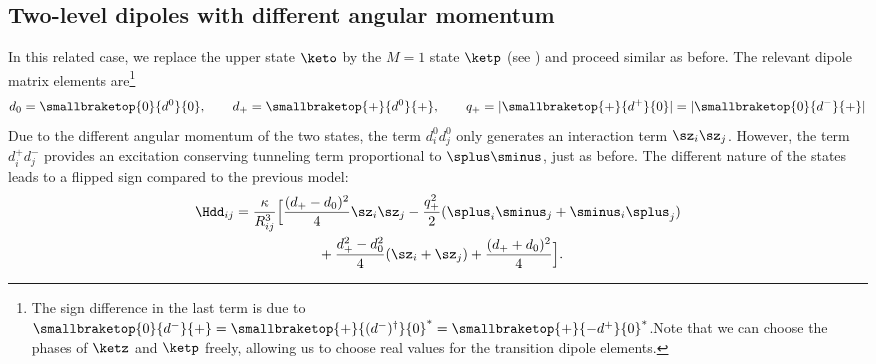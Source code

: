 
\subsection{Two-level dipoles with different angular momentum}
In this related case, we replace the upper state $\keto$ by the $M=1$ state $\ketp$ (see ) and proceed similar as before.
The relevant dipole matrix elements are\footnote{The sign difference in the last term is due to $\smallbraketop{0}{d^-}{+} = \smallbraketop{+}{(d^-)^\dag}{0}^* = \smallbraketop{+}{- d^+}{0}^*$.Note that we can choose the phases of $\ketz$ and $\ketp$ freely, allowing us to choose real values for the transition dipole elements.}
\begin{align}
    d_0 = \smallbraketop{0}{d^0}{0},\qquad
    d_+ = \smallbraketop{+}{d^0}{+},\qquad
    q_+ = |\smallbraketop{+}{d^+}{0}| = |\smallbraketop{0}{d^-}{+}|
\end{align}
Due to the different angular momentum of the two states, the term $d^0_i d^0_j$ only generates an interaction term $\sz_i \sz_j$. However, the term $d^+_i d^-_j$ provides an excitation conserving tunneling term proportional to $\splus\sminus$, just as before. The different nature of the states leads to a flipped sign compared to the previous model:
\begin{align}
    \Hdd_{ij} &= \frac{\kappa}{R_{ij}^3} \Big[ \frac{(d_+-d_0)^2}{4} \sz_i \sz_j  - \frac{q_+^2}{2} (\splus_i \sminus_j + \sminus_i \splus_j) \\
              &\qquad\qquad\qquad + \frac{d_+^2 - d_0^2}{4} (\sz_i + \sz_j)  + \frac{(d_++d_0)^2}{4} \Big].
\end{align}

